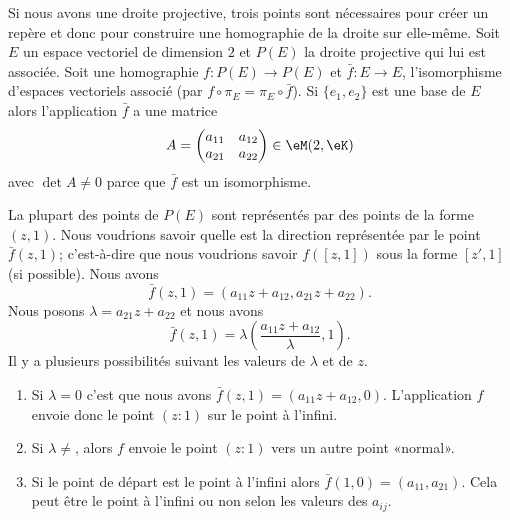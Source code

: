 \begin{normaltext}
    Si nous avons une droite projective, trois points sont nécessaires pour créer un repère et donc pour construire une homographie de la droite sur elle-même. Soit \( E\) un espace vectoriel de dimension \( 2\) et \( P(E)\) la droite projective qui lui est associée. Soit une homographie \( f\colon P(E)\to P(E)\) et \( \bar f\colon E\to E\), l'isomorphisme d'espaces vectoriels associé (par \( f\circ\pi_E=\pi_E\circ \bar f\)). Si \( \{ e_1,e_2 \}\) est une base de $E$ alors l'application \( \bar f\) a une matrice
    \begin{equation}
        A=\begin{pmatrix}
            a_{11}    &   a_{12}    \\
            a_{21}    &   a_{22}
        \end{pmatrix}\in \eM(2,\eK)
    \end{equation}
    avec \( \det A\neq 0\) parce que \( \bar f\) est un isomorphisme.

    La plupart des points de \( P(E)\) sont représentés par des points de la forme \( (z,1)\). Nous voudrions savoir quelle est la direction représentée par le point \( \bar f(z,1)\); c'est-à-dire que nous voudrions savoir \( f([z,1])\) sous la forme \( [z',1]\) (si possible). Nous avons
    \begin{equation}
        \bar f(z,1)=(a_{11}z+a_{12},a_{21}z+a_{22}).
    \end{equation}
    Nous posons \( \lambda=a_{21}z+a_{22}\) et nous avons
    \begin{equation}
        \bar f(z,1)=\lambda\left( \frac{ a_{11}z+a_{12} }{ \lambda },1 \right).
    \end{equation}
    Il y a plusieurs possibilités suivant les valeurs de \( \lambda\) et de \( z\).

    \begin{enumerate}
        \item
            Si \( \lambda=0\) c'est que nous avons \( \bar f(z,1)=(a_{11}z+a_{12},0)\). L'application \( f\) envoie donc le point \( (z:1)\) sur le point à l'infini.
        \item
            Si \( \lambda\neq \), alors \( f\) envoie le point \( (z:1)\) vers un autre point «normal».
        \item
            Si le point de départ est le point à l'infini alors \( \bar f(1,0)=(a_{11},a_{21})\). Cela peut être le point à l'infini ou non selon les valeurs des \( a_{ij}\).
    \end{enumerate}


\end{normaltext}
